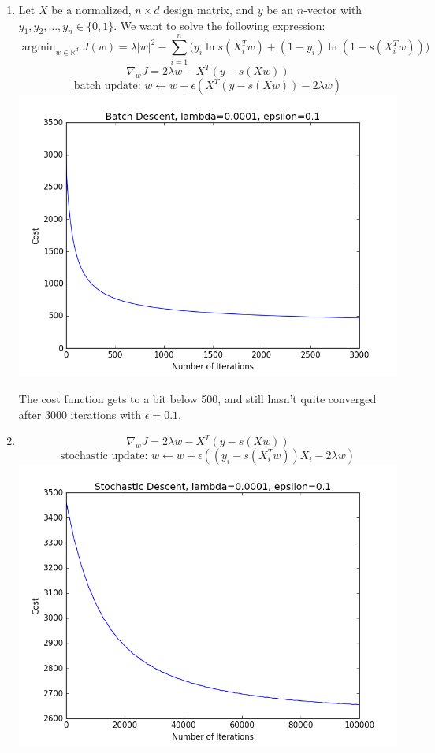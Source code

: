 \documentclass{article}
\newcommand{\R}{\mathbb{R}}
\DeclareMathOperator*{\argmin}{argmin}
\begin{document}
\begin{enumerate}[label=\arabic*)]
\item
Let $X$ be a normalized, $n \times d$ design matrix, and $y$ be an $n$-vector with $y_1, y_2, \dots, y_n \in \{0, 1\}$. We want to solve the following expression:
$$\argmin_{w \in \R^d}J(w)=\lambda |w|^2-\sum_{i=1}^n\bigg(y_i\ln s(X_i^Tw)+(1-y_i)\ln(1-s(X_i^Tw))\bigg)$$
$$\nabla_{w}J=2\lambda w - X^T(y-s(Xw))$$
$$\text{batch update: } w \leftarrow w + \epsilon(X^T(y-s(Xw))-2\lambda w)$$
\includegraphics[scale=.6]{images/batch.png}

The cost function gets to a bit below 500, and still hasn't quite converged after 3000 iterations with $\epsilon=0.1$.

\newpage
\item
$$\nabla_wJ = 2\lambda w - X^T(y-s(Xw))$$
$$\text{stochastic update: } w \leftarrow w + \epsilon((y_i-s(X_i^Tw))X_i - 2\lambda w)$$
\includegraphics[scale=.6]{images/stoch.png}


\end{enumerate}
\end{document}
